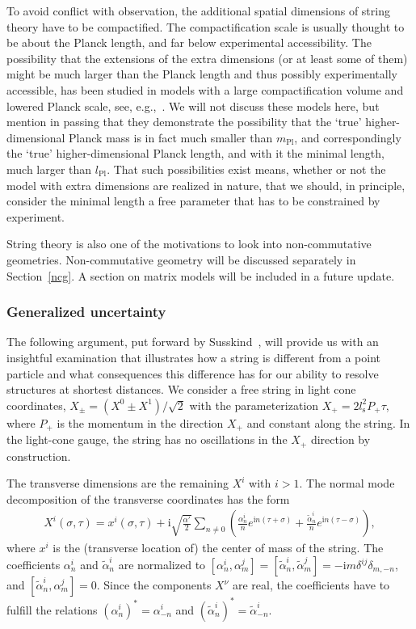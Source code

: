 \documentclass{article}
\def\beqn{\begin{eqnarray}}
\def\eeqn{\end{eqnarray}}
\begin{document}
To avoid 
conflict with observation, the additional 
spatial dimensions of string theory have to be compactified. The compactification scale is usually 
thought to
be about the Planck length, and far below experimental accessibility. The possibility that
the extensions of the extra dimensions (or at least some of them) might be much larger than the Planck length and thus 
possibly experimentally accessible, has 
been studied in models with a large compactification volume and lowered Planck scale, see, e.g.,~\cite{Abel:2004rp}. 
We will not discuss these models here, but mention in passing that they demonstrate the
possibility that the `true' higher-dimensional Planck mass is in fact much smaller than $m_{\mathrm{Pl}}$, and correspondingly
the `true' higher-dimensional Planck length, and with it the minimal length, much larger than $l_{\mathrm{Pl}}$. 
That such possibilities exist means, whether or not the model with extra dimensions are realized in nature,
that we should, in principle, consider the minimal length a free parameter that has to be constrained by
experiment. 

String theory is also one of the motivations to look into non-commutative geometries. Non-commutative geometry 
will be discussed
separately in Section~\ref{ncg}. A section on matrix models will be included in a future update.

\subsubsection{Generalized uncertainty}

The following argument, put forward by Susskind~\cite{Susskind:1993ki,Susskind:1993aa}, 
will provide us with an insightful examination that illustrates how a string is different from a
point particle and what consequences this
difference has for our ability to resolve structures at shortest distances.
We consider a free string in light cone coordinates, $X_{\pm} = (X^0 \pm X^1)/\sqrt{2}$
with the parameterization $X_+ = 2 l_{\mathrm{s}}^2 P_+ \tau$, where $P_+$ is the momentum in the direction $X_+$ and
constant along the string. In the light-cone gauge, the string has no oscillations in the $X_+$ direction by
construction.

 The transverse dimensions are the remaining $X^i$ with
$i>1$. The normal
mode decomposition of the transverse coordinates has the form
\beqn
X^i(\sigma,\tau) = x^i(\sigma,\tau) + \mathrm{i} \sqrt{\frac{\alpha'}{2}} \sum_{n \neq 0} \left( \frac{\alpha^i_n}{n} e^{\mathrm{i}n(\tau+\sigma)} + \frac{\tilde{\alpha}^i_n}{n} e^{\mathrm{i}n (\tau -\sigma)} \right) , \label{stringexp}
\eeqn
where $x^i$ is the (transverse location of) the center of mass of the string. The coefficients $\alpha^i_n$ and $\tilde \alpha^i_n$ are
normalized to $[\alpha^i_n, \alpha^j_m] = [\tilde \alpha^i_n, \tilde \alpha^j_m] = - \mathrm{i} m \delta^{ij}\delta_{m,-n}$, and $[\tilde \alpha^i_n, \alpha^j_m] = 0$. Since the components $X^\nu$ are real, the coefficients have to fulfill the relations $(\alpha^i_n)^* = \alpha^i_{-n}$ and $(\tilde \alpha^i_n)^* = \tilde \alpha^i_{-n}$. 
\end{document}

